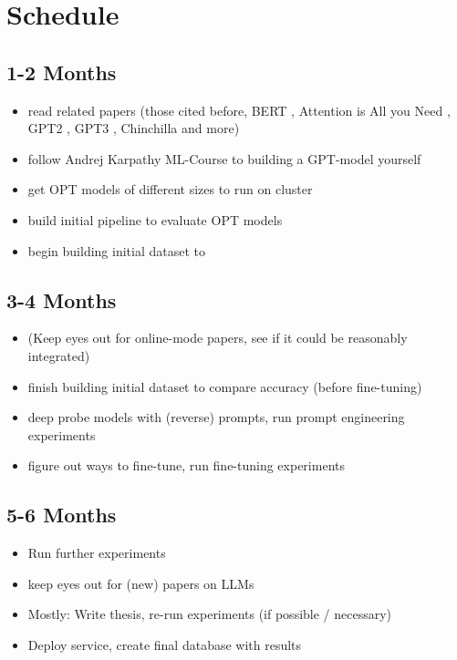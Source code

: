 \documentclass[a4paper,12pt]{article}
\begin{document}
\section{Schedule}

\subsection{1-2 Months}
\begin{itemize}
    \item read related papers (those cited before, BERT \cite{devlin_bert_2018}, Attention is All you Need \cite{vaswani_attention_2017}, GPT2 \cite{radford_language_2019}, GPT3 \cite{brown_language_2020}, Chinchilla \cite{hoffmann_training_2022} and more)
    \item follow Andrej Karpathy ML-Course to building a GPT-model yourself
    \item get OPT models of different sizes to run on cluster
    \item build initial pipeline to evaluate OPT models
    \item begin building initial dataset to 
\end{itemize}

\subsection{3-4 Months}
\begin{itemize}
    \item (Keep eyes out for online-mode papers, see if it could be reasonably integrated)
    \item finish building initial dataset to compare accuracy (before fine-tuning)
    \item deep probe models with (reverse) prompts, run prompt engineering experiments
    \item figure out ways to fine-tune, run fine-tuning experiments
\end{itemize}

\subsection{5-6 Months}
\begin{itemize}
    \item Run further experiments
    \item keep eyes out for (new) papers on LLMs
    \item Mostly: Write thesis, re-run experiments (if possible / necessary)
    \item Deploy service, create final database with results
\end{itemize}


 
\end{document}
